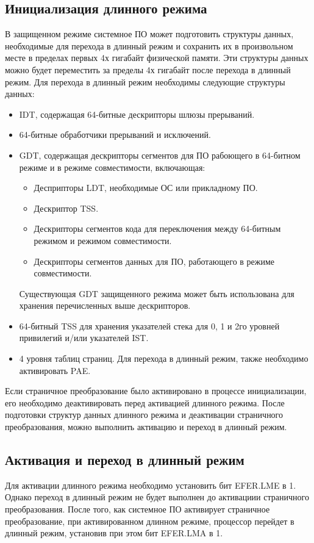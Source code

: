 \subsection{Инициализация длинного режима}
В защищенном режиме системное ПО может подготовить структуры данных, необходимые для перехода в
длинный режим и сохранить их в произвольном месте в пределах первых 4х гигабайт физической памяти.
Эти структуры данных можно будет переместить за пределы 4х гигабайт после перехода в длинный режим.
Для перехода в длинный режим необходимы следующие структуры данных:
\begin{itemize}
\item IDT, содержащая 64-битные дескрипторы шлюзы прерываний.
\item 64-битные обработчики прерываний и исключений.
\item GDT, содержащая дескрипторы сегментов для ПО рабоющего в 64-битном режиме и в
	режиме совместимости, включающая:
	\begin{itemize}
	\item Десприпторы LDT, необходимые ОС или прикладному ПО.
	\item Дескриптор TSS.
	\item Дескрипторы сегментов кода для переключения между 64-битным режимом и режимом совместимости.
	\item Дескрипторы сегментов данных для ПО, работающего в режиме совместимости.
	\end{itemize}

	Существующая GDT защищенного режима может быть использована для хранения перечисленных
	выше дескрипторов.
\item 64-битный TSS для хранения указателей стека для 0, 1 и 2го уровней привилегий и/или указателей IST.
\item 4 уровня таблиц страниц. Для перехода в длинный режим, также необходимо активировать PAE.
\end{itemize}

Если страничное преобразование было активировано в процессе инициализации, его необходимо деактивировать перед
активацией длинного режима. После подготовки структур данных длинного режима и деактивации страничного преобразования,
можно выполнить активацию и переход в длинный режим.

\subsection{Активация и переход в длинный режим}
Для активации длинного режима необходимо установить бит EFER.LME в 1. Однако переход в длинный режим
не будет выполнен до активациии страничного преобразования. После того, как системное ПО
активирует страничное преобразование, при активированном длинном режиме, процессор перейдет в
длинный режим, установив при этом бит EFER.LMA в 1.


